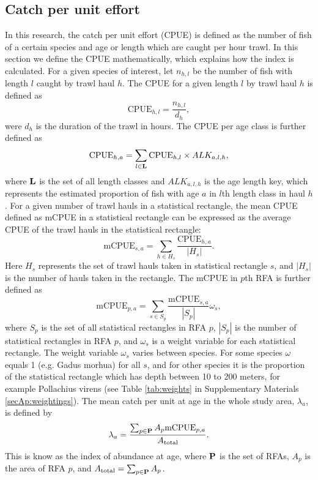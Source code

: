 \documentclass[a4paper 12pt]{article}
\numberwithin{equation}{section}
\begin{document}
\subsection{Catch per unit effort}
\label{sec:cpueestimators}
In this research, the catch per unit effort (CPUE) is defined as the number of fish of a certain species and age or length which are caught per hour trawl. In this section we define the CPUE mathematically, which explains how the index is calculated. For a given species of interest, let $n_{h,l}$ be the number of fish with length $l$ caught by trawl haul $h$. The CPUE for a given length $l$ by trawl haul $h$ is defined as 
\begin{equation}\label{eq:cpueHaul}
\mathrm{CPUE}_{h,l} =\frac{n_{h,l}}{d_h},
\end{equation}
were $d_h$ is the duration of the trawl in hours. The CPUE per age class is further defined as
\begin{equation}\label{eq:cpueALK}
\mathrm{CPUE}_{h,a} =\sum_{l \in {\bf L}}\mathrm{CPUE}_{h, l} \times ALK_{a,l,h},
\end{equation}
where ${\bf L}$ is the set of all length classes and $ALK_{a,l,h}$ is the age length key, which represents the estimated proportion of fish with age $a$ in $l$th length class in haul $h$. For a given number of trawl hauls in a statistical rectangle, the mean CPUE defined as  mCPUE  in a statistical rectangle can be expressed as the average CPUE of the trawl hauls in the statistical rectangle:
\begin{equation}\label{eq:cpueRec}
\mathrm{mCPUE}_{s,a} =\sum_{h \in H_{s}}\frac{\mathrm{CPUE}_{h,a}}{|H_{s}|}.
\end{equation}
Here $H_{s}$ represents the set of trawl hauls taken in statistical rectangle $s$, and $|H_{s}|$ is the number of hauls taken in the rectangle. The mCPUE in $p$th RFA is further defined as
\begin{equation}\label{eq:cpueRFA}
\mathrm{mCPUE}_{p,a} = \sum_{s \in S_{p}} \frac{\mathrm{mCPUE}_{s,a}}{|S_{p}|} \omega_s,
\end{equation}
where $S_{p}$ is the set of all statistical rectangles in RFA $p$, $|S_{p}|$ is the number of statistical rectangles in RFA $p$, and $\omega_s$ is a weight variable for each statistical rectangle. The weight variable $\omega_s$ varies between species. For some species $\omega$ equals 1 (e.g. Gadus morhua) for all $s$, and for other species it is the proportion of the statistical rectangle which has depth between 10 to 200 meters, for example Pollachius virens (see Table \ref{tab:weights} in Supplementary Materials \ref{secAp:weightings}).  The mean catch per unit at age in the whole study area, $\lambda_{a}$, is defined by
\begin{equation}
\lambda_{a}= \frac{\sum_{p\in {\bf P}} A_{p}  \mathrm{mCPUE}_{p,a}}{A_{\text{total}}}.
\label{abundanceestimatornorthsea}
\end{equation}
This is know as the index of abundance at age, where ${\bf P}$ is the set of RFAs, $A_p$ is the area of RFA $p$, and $A_{\text{total}} = \sum_{p\in {\bf P}} A_{p}$.
\end{document}

